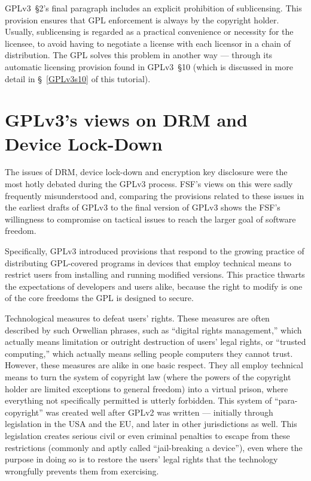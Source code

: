 GPLv3~\S2's final paragraph includes an explicit prohibition of sublicensing.
This provision ensures that GPL enforcement is always by the copyright
holder.  Usually, sublicensing is regarded as a practical convenience or
necessity for the licensee, to avoid having to negotiate a license with each
licensor in a chain of distribution.  The GPL solves this problem in another
way --- through its automatic licensing provision found in GPLv3~\S10 (which
is discussed in more detail in \S~\ref{GPLv3s10} of this tutorial).

\section{GPLv3's views on DRM and Device Lock-Down}
\label{GPLv3-drm}

The issues of DRM, device lock-down and encryption key disclosure were the
most hotly debated during the GPLv3 process.  FSF's views on this were sadly
frequently misunderstood and, comparing the provisions related to these
issues in the earliest drafts of GPLv3 to  the final version of GPLv3 shows
the FSF's willingness to compromise on tactical issues to reach the larger
goal of software freedom.

Specifically, GPLv3 introduced provisions that respond to the growing
practice of distributing GPL-covered programs in devices that employ
technical means to restrict users from installing and running modified
versions.  This practice thwarts the expectations of developers and users
alike, because the right to modify is one of the core freedoms the GPL is
designed to secure.

Technological measures to defeat users' rights.  These measures are often
described by such Orwellian phrases, such as ``digital rights management,''
which actually means limitation or outright destruction of users' legal
rights, or ``trusted computing,'' which actually means selling people
computers they cannot trust.  However, these measures are alike in one basic
respect.  They all employ technical means to turn the system of copyright law
(where the powers of the copyright holder are limited exceptions to general
freedom) into a virtual prison, where everything not specifically permitted
is utterly forbidden.  This system of ``para-copyright'' was created well
after GPLv2 was written --- initially through legislation in the USA and the
EU, and later in other jurisdictions as well.  This legislation creates
serious civil or even criminal penalties to escape from these restrictions
(commonly and aptly called ``jail-breaking a device''), even where the
purpose in doing so is to restore the users' legal rights that the technology
wrongfully prevents them from exercising.

